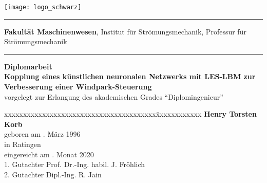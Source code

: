 \begin{titlepage}
\addtolength{\topmargin}{-1.5cm}
\hspace{-2.1cm} \texttt{[image: logo\_schwarz]}
\vspace{0.5cm}
\hrule 
\vspace{0.05cm}
\small\textbf{Fakult\"at Maschinenwesen},
Institut f\"ur Str\"omungsmechanik,
Professur f\"ur Str\"omungsmechanik
\vspace{0.1cm}
\hrule 
\vspace{4cm}
\textbf{\Large Diplomarbeit}\\

\vspace{1.5cm}
%
\textbf{\LARGE Kopplung eines künstlichen neuronalen Netzwerks mit LES-LBM zur Verbesserung einer Windpark-Steuerung}\\[2.0cm]
%

vorgelegt zur Erlangung des akademischen Grades "`Diplomingenieur"'\\[2.5cm]

\begin{tabbing}
	xxxxxxxxxxxxxxxxxxxxxxxxxxxxxxxxxxxxxxxx\=xxxxxxxxxxxx\kill
	\>	\textbf{Henry Torsten Korb}									\\
	geboren am						. März 1996											\\
	in										\>	Ratingen															\\[0.1cm]
	eingereicht am				. Monat 2020													\\[0.5cm]
	1. Gutachter					\>  Prof. Dr.-Ing. habil. J. Fr\"ohlich			\\
	2. Gutachter					\>	Dipl.-Ing. R. Jain											\\
\end{tabbing}
\cleardoublepage

\end{titlepage}